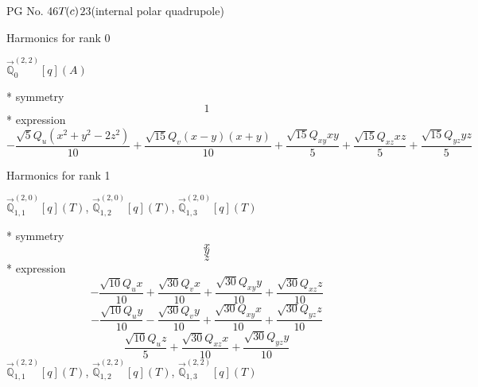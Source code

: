 \documentclass[fleqn,8pt]{jsarticle}
\begin{document}
\setcounter{MaxMatrixCols}{32}

\renewcommand{\tablename}{Table~}
\renewcommand{\figurename}{Figure~}
\begin{center}
\LARGE
PG No. 46\quad$T_{\rm }(c)$\quad$23$\quad[ cubic ] (internal polar quadrupole)
\end{center}

\noindent * Harmonics for rank 0

\noindent\quad $\vec{\mathbb{Q}}_{0}^{(2,2)}[q](A)$

\noindent\quad ** symmetry
\begin{dmath*}
1
\end{dmath*}
\noindent\quad ** expression
\begin{dmath*}
- \frac{\sqrt{5} Q_{u} \left(x^{2} + y^{2} - 2 z^{2}\right)}{10} + \frac{\sqrt{15} Q_{v} \left(x - y\right) \left(x + y\right)}{10} + \frac{\sqrt{15} Q_{xy} x y}{5} + \frac{\sqrt{15} Q_{xz} x z}{5} + \frac{\sqrt{15} Q_{yz} y z}{5}
\end{dmath*}

\noindent * Harmonics for rank 1

\noindent\quad $\vec{\mathbb{Q}}_{1,1}^{(2,0)}[q](T)$, $\vec{\mathbb{Q}}_{1,2}^{(2,0)}[q](T)$, $\vec{\mathbb{Q}}_{1,3}^{(2,0)}[q](T)$

\noindent\quad ** symmetry
\begin{dmath*}
x
\end{dmath*}
\begin{dmath*}
y
\end{dmath*}
\begin{dmath*}
z
\end{dmath*}
\noindent\quad ** expression
\begin{dmath*}
- \frac{\sqrt{10} Q_{u} x}{10} + \frac{\sqrt{30} Q_{v} x}{10} + \frac{\sqrt{30} Q_{xy} y}{10} + \frac{\sqrt{30} Q_{xz} z}{10}
\end{dmath*}
\begin{dmath*}
- \frac{\sqrt{10} Q_{u} y}{10} - \frac{\sqrt{30} Q_{v} y}{10} + \frac{\sqrt{30} Q_{xy} x}{10} + \frac{\sqrt{30} Q_{yz} z}{10}
\end{dmath*}
\begin{dmath*}
\frac{\sqrt{10} Q_{u} z}{5} + \frac{\sqrt{30} Q_{xz} x}{10} + \frac{\sqrt{30} Q_{yz} y}{10}
\end{dmath*}
\noindent\quad $\vec{\mathbb{Q}}_{1,1}^{(2,2)}[q](T)$, $\vec{\mathbb{Q}}_{1,2}^{(2,2)}[q](T)$, $\vec{\mathbb{Q}}_{1,3}^{(2,2)}[q](T)$
\end{document}
